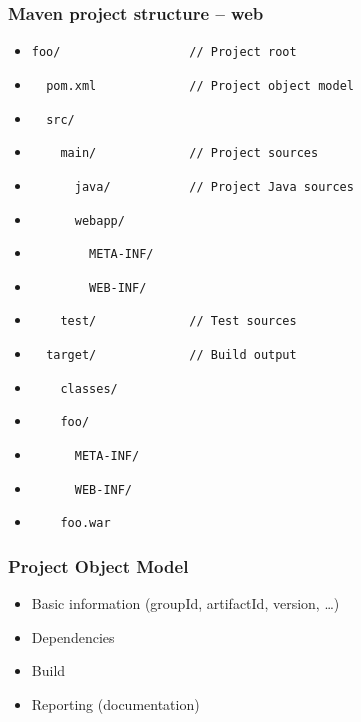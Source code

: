 \documentclass[10pt,xcolor=pdflatex]{beamer}
\begin{document}
\begin{frame}[fragile]\frametitle{Maven project structure -- web}
\begin{itemize}
    \item[] \verb+foo/                  // Project root+
    \item[] \verb+  pom.xml             // Project object model+
    \item[] \verb+  src/               +
    \item[] \verb+    main/             // Project sources+
    \item[] \verb+      java/           // Project Java sources+
    \item[] \verb+      webapp/+
    \item[] \verb+        META-INF/+
    \item[] \verb+        WEB-INF/+
    \item[] \verb+    test/             // Test sources+
    \item[] \verb+  target/             // Build output+
    \item[] \verb+    classes/+
    \item[] \verb+    foo/+
    \item[] \verb+      META-INF/+
    \item[] \verb+      WEB-INF/+
    \item[] \verb+    foo.war+
\end{itemize}
\end{frame}


\begin{frame}\frametitle{Project Object Model}
\begin{itemize}
  \item Basic information (groupId, artifactId, version, \ldots)
  \item Dependencies 
  \item Build
  \item Reporting (documentation)
\end{itemize}
\end{frame}
\end{document}
